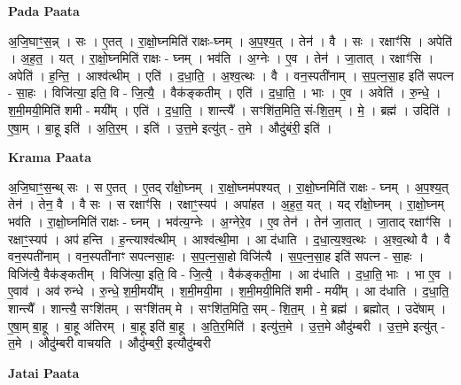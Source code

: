 \documentclass[17pt]{extarticle}
\begin{document}
\textbf{Pada Paata} \newline

अ॒जि॒घाꣳ॒॒स॒न्न् । सः । ए॒तत् । रा॒क्षो॒घ्नमिति॑ राक्षः-घ्नम् । अ॒प॒श्य॒त् । तेन॑ । वै । सः । रक्षाꣳ॑सि । अपेति॑ । अ॒ह॒त॒ । यत् । रा॒क्षो॒घ्नमिति॑ राक्षः - घ्नम् । भव॑ति । अ॒ग्नेः । ए॒व । तेन॑ । जा॒तात् । रक्षाꣳ॑सि । अपेति॑ । ह॒न्ति॒ । आश्व॑त्थीम् । एति॑ । द॒धा॒ति॒ । अ॒श्व॒त्थः । वै । वन॒स्पती॑नाम् । स॒प॒त्न॒सा॒ह इति॑ सपत्न - सा॒हः । विजि॑त्या॒ इति॒ वि - जि॒त्यै॒ । वैक॑ङ्कतीम् । एति॑ । द॒धा॒ति॒ । भाः । ए॒व । अवेति॑ । रु॒न्धे॒ । श॒मी॒मयी॒मिति॑ शमी - मयी᳚म् । एति॑ । द॒धा॒ति॒ । शान्त्यै᳚ । सꣳशि॑त॒मिति॒ सं-शि॒त॒म् । मे॒ । ब्रह्म॑ । उदिति॑ । ए॒षा॒म् । बा॒हू इति॑ । अ॒ति॒र॒म् । इति॑ । उ॒त्त॒मे इत्यु॑त् - त॒मे । औदु॑बंरी॒ इति॑ ।  \newline


\textbf{Krama Paata} \newline

अ॒जि॒घाꣳ॒॒स॒न्थ् सः । स ए॒तत् । ए॒तद् रा᳚क्षो॒घ्नम् । रा॒क्षो॒घ्नम॑पश्यत् । रा॒क्षो॒घ्नमिति॑ राक्षः - घ्नम् । 
अ॒प॒श्य॒त् तेन॑ । तेन॒ वै । वै सः । स रक्षाꣳ॑सि । रक्षाꣳ॒॒स्यप॑ । अपा॑हत । अ॒ह॒त॒ यत् । यद् रा᳚क्षो॒घ्नम् । रा॒क्षो॒घ्नम् भव॑ति । रा॒क्षो॒घ्नमिति॑ राक्षः - घ्नम् । भव॑त्य॒ग्नेः । अ॒ग्नेरे॒व । ए॒व तेन॑ । तेन॑ जा॒तात् । जा॒ताद् रक्षाꣳ॑सि । रक्षाꣳ॒॒स्यप॑ । अप॑ हन्ति । ह॒न्त्याश्व॑त्थीम् । आश्व॑त्थी॒मा । आ द॑धाति । द॒धा॒त्य॒श्व॒त्थः । अ॒श्व॒त्थो वै । वै वन॒स्पती॑नाम् । वन॒स्पती॑नाꣳ सपत्नसा॒हः । स॒प॒त्न॒सा॒हो विजि॑त्यै । स॒प॒त्न॒सा॒ह इति॑ सपत्न - सा॒हः । विजि॑त्यै॒ वैक॑ङ्कतीम् । विजि॑त्या॒ इति॒ वि - जि॒त्यै॒ । वैक॑ङ्कती॒मा । आ द॑धाति । द॒धा॒ति॒ भाः । भा ए॒व । ए॒वाव॑ । अव॑ रुन्धे । रु॒न्धे॒ श॒मी॒मयी᳚म् । श॒मी॒मयी॒मा । श॒मी॒मयी॒मिति॑ शमी - मयी᳚म् । आ द॑धाति । द॒धा॒ति॒ शान्त्यै᳚ । शान्त्यै॒ सꣳशि॑तम् । सꣳशि॑तम् मे । सꣳशि॑त॒मिति॒ सम् - शि॒त॒म् । मे॒ ब्रह्म॑ । ब्रह्मोत् । उदे॑षाम् । ए॒षा॒म् बा॒हू । बा॒हू अ॑तिरम् । बा॒हू इति॑ बा॒हू । अ॒ति॒र॒मिति॑ । इत्यु॑त्त॒मे । उ॒त्त॒मे औदु॑म्बरी । उ॒त्त॒मे इत्यु॑त् - त॒मे । औदु॑म्बरी वाचयति । औदु॑म्बरी॒ इत्यौदु॑म्बरी \newline

\textbf{Jatai Paata} \newline
\end{document}
